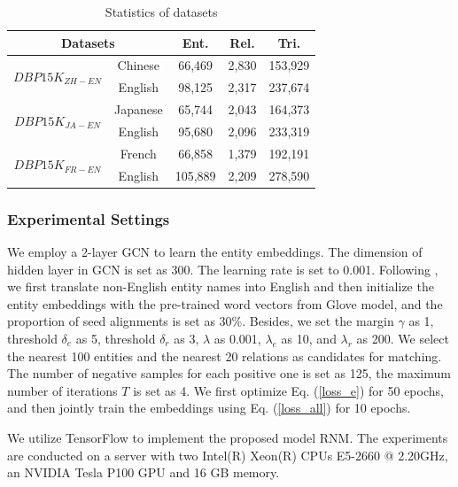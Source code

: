\documentclass[letterpaper]{article} %
\begin{document}
\begin{table}[htb]
\centering \scriptsize
\begin{tabular}{c|c|c|ccc}
\hline \multicolumn{3}{c|}{\textbf{Datasets}}         &
\textbf{Ent.}    & \textbf{Rel.}     & \textbf{Tri.}  \\ \hline
\multicolumn{2}{c|}{\multirow{2}{*}{$DBP15K_{ZH-EN}$}} & Chinese        & 66,469   & 2,830   & 153,929   \\
\multicolumn{2}{c|}{}                       & English        &
98,125   & 2,317   & 237,674   \\ \hline
\multicolumn{2}{c|}{\multirow{2}{*}{$DBP15K_{JA-EN}$}} & Japanese        & 65,744   & 2,043   & 164,373   \\
\multicolumn{2}{c|}{}                       & English        &
95,680   & 2,096   & 233,319   \\ \hline
\multicolumn{2}{c|}{\multirow{2}{*}{$DBP15K_{FR-EN}$}} & French        & 66,858   & 1,379   & 192,191   \\
\multicolumn{2}{c|}{}                       & English        &
105,889   & 2,209   & 278,590  \\ \hline
\end{tabular}
\caption{Statistics of datasets} \label{datasets}
\end{table}


\subsubsection{Experimental Settings}

We employ a 2-layer GCN to learn the entity embeddings. The
dimension of hidden layer in GCN is set as 300. The learning rate is
set to 0.001. Following \cite{wu2020neighborhood}, we first translate
non-English entity names into English and then
initialize the entity embeddings with the pre-trained word vectors
from Glove model, and the proportion of seed alignments is set as
30\%. Besides, we set the margin $\gamma$ as 1, threshold $\delta_e$
as 5, threshold $\delta_r$ as 3, $\lambda$ as 0.001, $\lambda_e$ as
10, and $\lambda_r$ as 200. We select the nearest 100 entities and
the nearest 20 relations as candidates for matching. The
number of negative samples for each positive one is set as 125, the
maximum number of iterations $T$ is set as 4. We first optimize Eq.
(\ref{loss_e}) for 50 epochs, and then jointly train the embeddings using
Eq. (\ref{loss_all}) for 10 epochs.

We utilize TensorFlow to implement the proposed model RNM. The
experiments are conducted on a server with two Intel(R) Xeon(R) CPUs
E5-2660 @ 2.20GHz, an NVIDIA Tesla P100 GPU and 16 GB memory.
\end{document}
